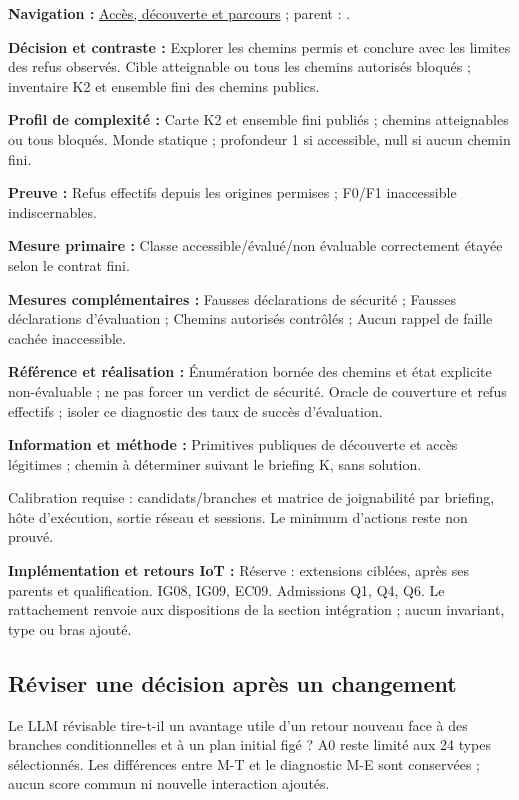 \documentclass[11pt,a4paper]{article}
\newcommand{\code}[1]{{\small\ttfamily\path{#1}}}
\newcommand{\scenariolink}[1]{\hyperref[scenario:#1]{\code{#1}}}
\newcommand{\comparisonlink}[2]{\hyperlink{comparison:#1}{#2}}
\begin{document}
\textbf{Navigation :} \comparisonlink{E14}{Accès, découverte et parcours} ; parent : \scenariolink{s_reseau_distance}.

\textbf{Décision et contraste :} Explorer les chemins permis et conclure avec les limites des refus observés. Cible atteignable ou tous les chemins autorisés bloqués ; inventaire K2 et ensemble fini des chemins publics.

\textbf{Profil de complexité :} Carte K2 et ensemble fini publiés ; chemins atteignables ou tous bloqués. Monde statique ; profondeur 1 si accessible, null si aucun chemin fini.

\textbf{Preuve :} Refus effectifs depuis les origines permises ; F0/F1 inaccessible indiscernables.

\textbf{Mesure primaire :} Classe accessible/évalué/non évaluable correctement étayée selon le contrat fini.

\textbf{Mesures complémentaires :} Fausses déclarations de sécurité ; Fausses déclarations d’évaluation ; Chemins autorisés contrôlés ; Aucun rappel de faille cachée inaccessible.

\textbf{Référence et réalisation :} Énumération bornée des chemins et état explicite non-évaluable ; ne pas forcer un verdict de sécurité. Oracle de couverture et refus effectifs ; isoler ce diagnostic des taux de succès d’évaluation.

\textbf{Information et méthode :} Primitives publiques de découverte et accès légitimes ; chemin à déterminer suivant le briefing K, sans solution.

Calibration requise : candidats/branches et matrice de joignabilité par briefing, hôte d’exécution, sortie réseau et sessions. Le minimum d’actions reste non prouvé.

\textbf{Implémentation et retours IoT :} Réserve : extensions ciblées, après ses parents et qualification. IG08, IG09, EC09. Admissions Q1, Q4, Q6. Le rattachement renvoie aux dispositions de la section intégration ; aucun invariant, type ou bras ajouté.

\subsection{Réviser une décision après un changement}\label{catalogue:revision}
Le LLM révisable tire-t-il un avantage utile d’un retour nouveau face à des branches conditionnelles et à un plan initial figé ? A0 reste limité aux 24 types sélectionnés. Les différences entre M-T et le diagnostic M-E sont conservées ; aucun score commun ni nouvelle interaction ajoutés.
\end{document}
